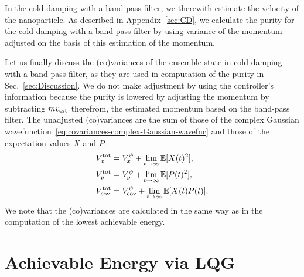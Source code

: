 \documentclass[aps,pra,superscriptaddress,twocolumn
]{revtex4-2}
\newcommand{\majrev}[1]{{#1}}
\begin{document}
 In the cold damping with a band-pass filter, 
we therewith estimate the velocity of the nanoparticle.
As described in Appendix~\ref{sec:CD},
we calculate the purity for the cold damping with a band-pass filter
by using variance of the momentum adjusted 
on the basis of this estimation of the momentum.

 {\majrev{Let us finally discuss the (co)variances of the ensemble state
  in cold damping with a band-pass filter,}
 as they are used in computation of the purity in Sec.~\ref{sec:Discussion}.
 \majrev{We do not make adjustment by using the controller's information 
 because the purity is lowered by adjusting the momentum
 by subtracting $mv_{\rm est}$ therefrom, 
 the estimated momentum based on the band-pass filter.}
 The unadjusted (co)variances are the sum of those of the complex Gaussian wavefunction~\eqref{eq:covariances-complex-Gaussian-wavefnc}
 and those of the expectation values $X$ and $P$:
 \begin{alignat}{1}
  V_x^{\rm tot} &= V_x^\psi + \lim_{t\to \infty} \mathbb{E}[X(t)^2],\\
  V_p^{\rm tot} &= V_p^\psi + \lim_{t\to \infty} \mathbb{E}[P(t)^2],\\
  V_{\rm cov}^{\rm tot} &= V_{\rm cov}^\psi + \lim_{t\to \infty} \mathbb{E}[X(t) P(t)].
 \end{alignat} 
 We note that the (co)variances are calculated in the same way as in the computation of 
 the lowest achievable energy.
 }












 \section{Achievable Energy via LQG} \label{AppLQG}
\end{document}
